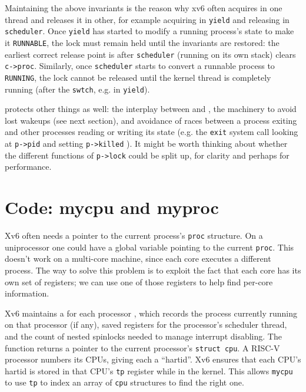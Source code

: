 Maintaining the above invariants is the reason why xv6 often acquires 
in one thread and releases it in other,
for example acquiring in
\lstinline{yield}
and releasing in
\lstinline{scheduler}.
Once \lstinline{yield} has started to modify a running process's state
to make it
\lstinline{RUNNABLE},
the lock must remain held until the invariants are restored:
the earliest correct release point is after
\lstinline{scheduler}
(running on its own stack)
clears
\lstinline{c->proc}.
Similarly, once 
\lstinline{scheduler}
starts to convert a runnable process to
\lstinline{RUNNING},
the lock cannot be released until the kernel thread
is completely running (after the
\lstinline{swtch},
e.g. in
\lstinline{yield}).

protects other things as well:
the interplay between
and
,
the machinery to avoid lost wakeups (see next section),
and avoidance of races between a process exiting and other processes
reading or writing its state (e.g. the \lstinline{exit}
system call looking at \lstinline{p->pid} and
setting \lstinline{p->killed}
).
It might be worth thinking about whether the 
different functions of
\lstinline{p->lock}
could be split up, for clarity and perhaps
for performance.
\section{Code: mycpu and myproc}

Xv6 often needs a pointer to the current process's \lstinline{proc}
structure. On a uniprocessor one could have a global variable pointing
to the current \lstinline{proc}. This doesn't work on a multi-core
machine, since each core executes a different process. The way to
solve this problem is to exploit the fact that each core has its own
set of registers; we can use one of those registers to help find
per-core information.

Xv6 maintains a
for each processor
,
which records
the process currently running
on that processor (if any),
saved registers for the processor's scheduler thread,
and the count of nested spinlocks needed to manage
interrupt disabling.
The function
returns a pointer to the current processor's
\lstinline{struct cpu}.
A RISC-V processor numbers its CPUs, giving each
a ``hartid''.
Xv6 ensures that each CPU's hartid is stored in that CPU's \lstinline{tp} register
while in the kernel.
This allows
\lstinline{mycpu} to use \lstinline{tp} to index an array
of \lstinline{cpu} structures to find the right one.

